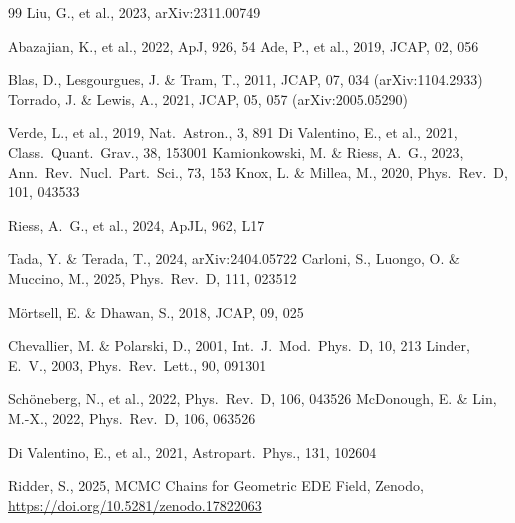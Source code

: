 \documentclass[a4paper,11pt]{article}
\begin{document}
\begin{thebibliography}{99}
 Liu, G., et al., 2023, arXiv:2311.00749

 Abazajian, K., et al., 2022, ApJ, 926, 54
 Ade, P., et al., 2019, JCAP, 02, 056

 Blas, D., Lesgourgues, J. \& Tram, T., 2011, JCAP, 07, 034 (arXiv:1104.2933)
 Torrado, J. \& Lewis, A., 2021, JCAP, 05, 057 (arXiv:2005.05290)

 Verde, L., et al., 2019, Nat.\ Astron., 3, 891
 Di Valentino, E., et al., 2021, Class.\ Quant.\ Grav., 38, 153001
 Kamionkowski, M. \& Riess, A.~G., 2023, Ann.\ Rev.\ Nucl.\ Part.\ Sci., 73, 153
 Knox, L. \& Millea, M., 2020, Phys.\ Rev.\ D, 101, 043533

 Riess, A.~G., et al., 2024, ApJL, 962, L17

 Tada, Y. \& Terada, T., 2024, arXiv:2404.05722
 Carloni, S., Luongo, O. \& Muccino, M., 2025, Phys.\ Rev.\ D, 111, 023512

 M\"{o}rtsell, E. \& Dhawan, S., 2018, JCAP, 09, 025

 Chevallier, M. \& Polarski, D., 2001, Int.\ J.\ Mod.\ Phys.\ D, 10, 213
 Linder, E.~V., 2003, Phys.\ Rev.\ Lett., 90, 091301

 Sch\"{o}neberg, N., et al., 2022, Phys.\ Rev.\ D, 106, 043526
 McDonough, E. \& Lin, M.-X., 2022, Phys.\ Rev.\ D, 106, 063526

 Di Valentino, E., et al., 2021, Astropart.\ Phys., 131, 102604

 Ridder, S., 2025, MCMC Chains for Geometric EDE Field, Zenodo, \url{https://doi.org/10.5281/zenodo.17822063}

\end{thebibliography}
\end{document}
